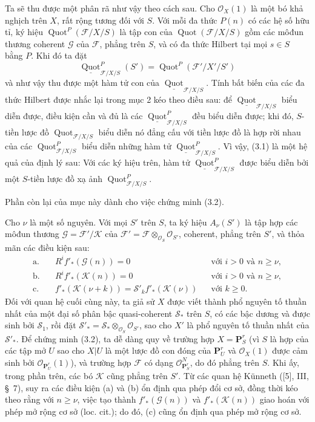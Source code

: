 Ta sẽ thu được một phân rã như vậy theo cách sau. Cho $\mathcal O_X(1)$ là một
bó khả nghịch trên $X$, rất rộng tương đối với $S$. Với mỗi đa thức $P(n)$ có
các hệ số hữu tỉ, ký hiệu $\operatorname{Quot}^P(\mathcal F/X/S)$ là tập con
của $\operatorname{Quot}(\mathcal F/X/S)$ gồm các môđun thương coherent
$\mathcal G$ của $\mathcal F$, phẳng trên $S$, và có đa thức Hilbert tại mọi
$s\in S$ bằng $P$. Khi đó ta đặt
\[
\underline{\operatorname{Quot}}^P_{\mathcal F/X/S}(S')
=\operatorname{Quot}^P(\mathcal F'/X'/S')
\]
và như vậy thu được một hàm tử con của
$\underline{\operatorname{Quot}}_{\mathcal F/X/S}$. Tính bất biến của các đa
thức Hilbert được nhắc lại trong mục 2 kéo theo điều sau: để
$\underline{\operatorname{Quot}}_{\mathcal F/X/S}$ biểu diễn được, điều kiện
cần và đủ là các $\underline{\operatorname{Quot}}^P_{\mathcal F/X/S}$ đều
biểu diễn được; khi đó, $S$-tiền lược đồ
$\operatorname{Quot}_{\mathcal F/X/S}$ biểu diễn nó đẳng cấu với tiền lược đồ
là hợp rời nhau của các $\operatorname{Quot}^P_{\mathcal F/X/S}$ biểu diễn
những hàm tử $\underline{\operatorname{Quot}}^P_{\mathcal F/X/S}$. Vì vậy,
(3.1) là một hệ quả của định lý sau:
 Với các ký hiệu trên, hàm tử
$\underline{\operatorname{Quot}}^P_{\mathcal F/X/S}$ được biểu diễn bởi một
$S$-tiền lược đồ xạ ảnh $\operatorname{Quot}^P_{\mathcal F/X/S}$.

Phần còn lại của mục này dành cho việc chứng minh (3.2).

Cho $\nu$ là một số nguyên. Với mọi $S'$ trên $S$, ta ký hiệu $A_\nu(S')$ là
tập hợp các môđun thương $\mathcal G=\mathcal F'/\mathcal K$ của
$\mathcal F'=\mathcal F\otimes_{\mathcal O_S}\mathcal O_{S'}$, coherent,
phẳng trên $S'$, và thỏa mãn các điều kiện sau:
\begin{align*}
\text{a.}\quad &R^if'_*(\mathcal G(n))=0 &&\text{với $i>0$ và $n\geq\nu$},\\
\text{b.}\quad &R^if'_*(\mathcal K(n))=0 &&\text{với $i>0$ và $n\geq\nu$},\\
\text{c.}\quad &f'_*(\mathcal K(\nu+k))
=\mathcal S'_k f'_*(\mathcal K(\nu)) &&\text{với $k\geq0$}.
\end{align*}
Đối với quan hệ cuối cùng này, ta giả sử $X$ được viết thành phổ nguyên tố
thuần nhất của một đại số phân bậc quasi-coherent $\mathcal S_*$ trên $S$, có
các bậc dương và được sinh bởi $\mathcal S_1$, rồi đặt
$\mathcal S'_* =\mathcal S_*\otimes_{\mathcal O_S}\mathcal O_{S'}$, sao cho
$X'$ là phổ nguyên tố thuần nhất của $\mathcal S'_*$. Để chứng minh (3.2), ta
dễ dàng quy về trường hợp $X=\mathbf P^r_S$ (vì $S$ là hợp của các tập mở $U$
sao cho $X|U$ là một lược đồ con đóng của $\mathbf P^r_U$ và
$\mathcal O_X(1)$ được cảm sinh bởi $\mathcal O_{\mathbf P^r_U}(1)$), và
trường hợp $\mathcal F$ có dạng $\mathcal O_{\mathbf P^r_S}^{N}$, do đó phẳng
trên $S$. Khi ấy, trong phần trên, các bó $\mathcal K$ cũng phẳng trên $S'$.
Từ các quan hệ Künneth ([5], III, \S~7), suy ra các điều kiện (a) và (b) ổn
định qua phép đổi cơ sở, đồng thời kéo theo rằng với $n\geq\nu$, việc tạo thành
$f'_*(\mathcal G(n))$ và $f'_*(\mathcal K(n))$ giao hoán với phép mở rộng cơ
sở (loc. cit.); do đó, (c) cũng ổn định qua phép mở rộng cơ sở.

